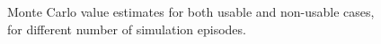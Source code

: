 \documentclass[10pt]{article}
\begin{document}
\begin{figure}[H]
\begin{subfigure}{0.45\textwidth}
 		\end{subfigure}
 		\begin{subfigure}{0.45\textwidth}
 		\end{subfigure}
 		\begin{subfigure}{0.45\textwidth}
 		\end{subfigure}
 		\caption{Monte Carlo value estimates for both usable and non-usable cases, for different number of simulation episodes.}
 	\end{figure}
\end{document}
